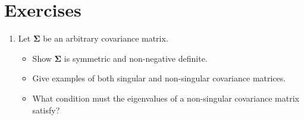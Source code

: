 \documentclass[]{book}
\providecommand{\tightlist}{%
  \setlength{\itemsep}{0pt}\setlength{\parskip}{0pt}}
\theoremstyle{definition}
\theoremstyle{definition}
\theoremstyle{definition}
\theoremstyle{remark}
\begin{document}
\hypertarget{exercises-ch3}{%
\section{Exercises}\label{exercises-ch3}}

\begin{enumerate}
\def\labelenumi{\arabic{enumi}.}
\tightlist
\item
  Let \(\boldsymbol{\Sigma}\) be an arbitrary covariance matrix.

  \begin{itemize}
  \tightlist
  \item
    Show \(\boldsymbol{\Sigma}\) is symmetric and
    non-negative definite.
  \item
    Give examples of both singular and non-singular covariance matrices.\\
  \item
    What condition must the eigenvalues of a non-singular covariance matrix satisfy?
  \end{itemize}
\end{enumerate}
\end{document}
